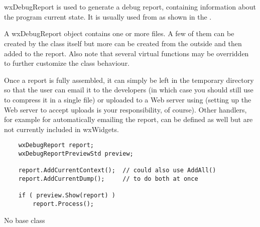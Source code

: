 
\section{}\label{wxdebugreport}

wxDebugReport is used to generate a debug report, containing information about
the program current state. It is usually used from 
 as shown in the 
.

A wxDebugReport object contains one or more files. A few of them can be created by the
class itself but more can be created from the outside and then added to the
report. Also note that several virtual functions may be overridden to further
customize the class behaviour.

Once a report is fully assembled, it can simply be left in the temporary
directory so that the user can email it to the developers (in which case you
should still use  to
compress it in a single file) or uploaded to a Web server using 
 (setting up the Web server
to accept uploads is your responsibility, of course). Other handlers, for example for
automatically emailing the report, can be defined as well but are not currently
included in wxWidgets.


\begin{verbatim}
    wxDebugReport report;
    wxDebugReportPreviewStd preview;

    report.AddCurrentContext();  // could also use AddAll()
    report.AddCurrentDump();     // to do both at once

    if ( preview.Show(report) )
        report.Process();
\end{verbatim}


No base class


